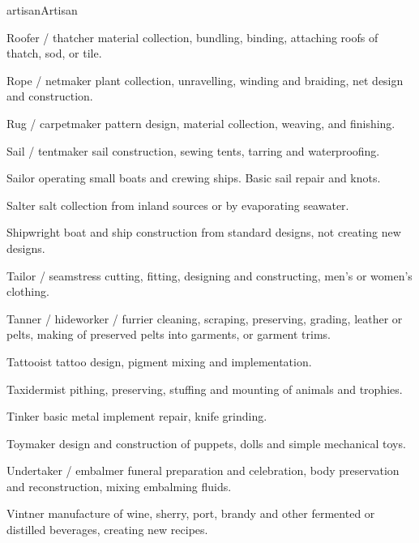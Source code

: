 \begin{Skill}[2.0]{artisan}{Artisan}
\begin{Description}
\item[Roofer / thatcher] material collection, bundling, binding,
  attaching roofs of thatch, sod, or tile.

\item[Rope / netmaker] plant collection, unravelling, winding and
  braiding, net design and construction.

\item[Rug / carpetmaker] pattern design, material collection,
  weaving, and finishing.

\item[Sail / tentmaker] sail construction, sewing tents, tarring and
  waterproofing.

\item[Sailor] operating small boats and crewing ships.  Basic sail
  repair and knots.

\item[Salter] salt collection from inland sources or by evaporating
  seawater.

\item[Shipwright] boat and ship construction from standard designs,
  not creating new designs.

\item[Tailor / seamstress] cutting, fitting, designing and
  constructing, men’s or women’s clothing.

\item[Tanner / hideworker / furrier] cleaning, scraping, preserving,
  grading, leather or pelts, making of preserved pelts into garments,
  or garment trims.

\item[Tattooist] tattoo design, pigment mixing and implementation.

\item[Taxidermist] pithing, preserving, stuffing and mounting of
  animals and trophies.

\item[Tinker] basic metal implement repair, knife grinding.

\item[Toymaker] design and construction of puppets, dolls and simple
  mechanical toys.

\item[Undertaker / embalmer] funeral preparation and celebration, body
  preservation and reconstruction, mixing embalming fluids.

\item[Vintner] manufacture of wine, sherry, port, brandy and other
  fermented or distilled beverages, creating new recipes.


\end{Description}
\end{Skill}
